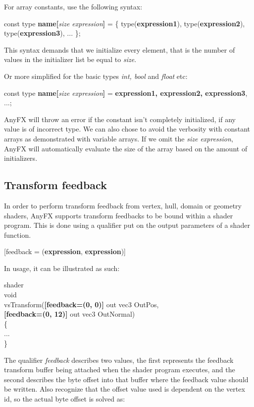 \documentclass{article}
\newcommand{\SyntaxBox}[1]
{	
	\begin{center}
	\colorbox{orange!60}
	{
		\begin{minipage}{\linewidth}
		\hfill
		\begin{tabbing}
		#1
		\end{tabbing}
		\end{minipage}
	}
	\end{center}
}
\begin{document}
For array constants, use the following syntax:

\SyntaxBox
{
	const type \textbf{name[}\textit{size expression}\textbf{]} = \{ type(\textbf{expression1}), type(\textbf{expression2}), type(\textbf{expression3}), ... \};
}

This syntax demands that we initialize every element, that is the number of values in the initializer list be equal to \textit{size}.

Or more simplified for the basic types \textit{int, bool} and \textit{float} etc:

\SyntaxBox
{
	const type \textbf{name[}\textit{size expression}\textbf{]} = \textbf{ expression1, expression2, expression3}, ...;
}


AnyFX will throw an error if the constant isn't completely initialized, if any value is of incorrect type. We can also chose to avoid the verbosity with constant arrays as demonstrated with variable arrays. If we omit the \textit{size expression}, AnyFX will automatically evaluate the size of the array based on the amount of initializers. 

\subsection{Transform feedback}
In order to perform transform feedback from vertex, hull, domain or geometry shaders, AnyFX supports transform feedbacks to be bound within a shader program. This is done using a qualifier put on the output parameters of a shader function.

\SyntaxBox
{
	[feedback = (\textbf{expression}, \textbf{expression})] \\
}

In usage, it can be illustrated as such:

\SyntaxBox
{
	shader \\
	void \\
	vsTransform(\=\textbf{[feedback=(0, 0)]} out vec3 OutPos, \\
		\> \textbf{[feedback=(0, 12)]} out vec3 OutNormal) \\
	\{ \= \\
	\>... \\
	\}
}

The qualifier \textit{feedback} describes two values, the first represents the feedback transform buffer being attached when the shader program executes, and the second describes the byte offset into that buffer where the feedback value should be written. Also recognize that the offset value used is dependent on the vertex id, so the actual byte offset is solved as:
\end{document}

